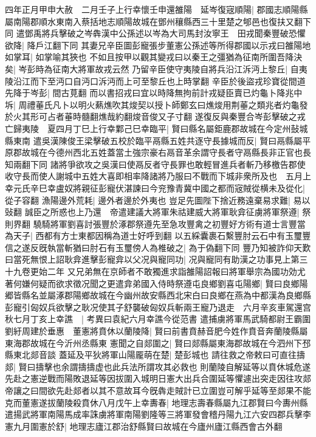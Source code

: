 四年正月甲申大赦　二月壬子上行幸懷壬申還雒陽　延岑復宼順陽|{
	郡國志順陽縣屬南陽郡順水東南入蔡括地志順陽故城在鄧州穰縣西三十里楚之郇邑也復扶又翻下同}
遣鄧禹將兵擊破之岑犇漢中公孫述以岑為大司馬封汝寧王　田戎聞秦豐破恐懼欲降|{
	降戶江翻下同}
其妻兄辛臣圖彭寵張步董憲公孫述等所得郡國以示戎曰雒陽地如掌耳|{
	如掌喻其狹也}
不如且按甲以觀其變戎曰以秦王之彊猶為征南所圍吾降決矣|{
	岑彭時為征南大將軍故戎云然}
乃留辛臣使守夷陵自將兵沿江泝沔上黎丘|{
	自夷陵沿江而下至沔口自沔口泝沔而上可至黎丘也上時掌翻}
辛臣於後盜戎珍寶從間道先降于岑彭|{
	間古莧翻}
而以書招戎曰宜以時降無拘前計戎疑臣賣已灼龜卜降兆中坼|{
	周禮菙氏凡卜以明火爇燋吹其焌契以授卜師鄭玄曰燋焌用荆菙之類兆者灼龜發於火其形可占者菙時髓翻燋哉約翻焌音俊又子寸翻}
遂復反與秦豐合岑彭擊破之戎亡歸夷陵　夏四月丁巳上行幸鄴己巳幸臨平|{
	賢曰縣名屬鉅鹿郡故城在今定州鼔城縣東南}
遣吳漢陳俊王梁擊破五校於臨平鬲縣五姓共逐守長據城而反|{
	賢曰鬲縣屬平原郡故城在今德州西北五姓蓋當土強宗豪右鬲音革余謂守長者守鬲縣長非正官也長知兩翻下同}
諸將爭欲攻之吳漢曰使鬲反者守長罪也敢輕冒進兵者斬乃移檄告郡使收守長而使人謝城中五姓大喜即相率降諸將乃服曰不戰而下城非衆所及也　五月上幸元氏辛巳幸盧奴將親征彭寵伏湛諫曰今兖豫青冀中國之都而宼賊從横未及從化|{
	從子容翻}
漁陽邊外荒耗|{
	邊外者邊於外夷也}
豈足先圖陛下捨近務遠棄易求難|{
	易以䜴翻}
誠臣之所惑也上乃還　帝遣建議大將軍朱祜建威大將軍耿弇征虜將軍祭遵|{
	祭則界翻}
驍騎將軍劉喜討張豐於涿郡祭遵先至急攻豐禽之初豐好方術有道士言豐當為天子|{
	西都有方士東都因稱為道士好呼到翻}
以五綵囊裹石繫豐肘云石中有玉璽豐信之遂反旣執當斬猶曰肘石有玉璽傍人為椎破之|{
	為于偽翻下同}
豐乃知被詐仰天歎曰當死無恨上詔耿弇進擊彭寵弇以父况與寵同功|{
	况與寵同有助漢之功事見上第三十九卷更始二年}
又兄弟無在京師者不敢獨進求詣雒陽詔報曰將軍舉宗為國功効尤著何嫌何疑而欲求徵况聞之更遣弇弟國入侍時祭遵屯良鄉劉喜屯陽鄉|{
	賢曰良鄉陽郷皆縣名並屬涿郡陽鄉故城在今幽州故安縣西北宋白曰良鄉在燕為中都漢為良鄉縣}
彭寵引匈奴兵欲擊之耿况使其子舒襲破匈奴兵斬兩王寵乃退走　六月辛亥車駕還宫　秋七月丁亥上幸譙　|{
	考異曰袁紀六月幸譙今從范書}
遣捕虜將軍馬武騎都尉王霸圍劉紆周建於垂惠　董憲將賁休以蘭陵降|{
	賢曰前書賁赫音肥今姓作賁音奔蘭陵縣屬東海郡故城在今沂州丞縣東}
憲聞之自郯圍之|{
	賢曰郯縣屬東海郡故城在今泗州下邳縣東北郯音談}
蓋延及平狄將軍山陽龎萌在楚|{
	楚彭城也}
請往救之帝敕曰可直往擣郯|{
	賢曰擣擊也余謂擣擣虚也此兵法所謂攻其必救也}
則蘭陵自解延等以賁休城危遂先赴之憲逆戰而陽敗退延等因拔圍入城明日憲大出兵合圍延等懼遽出突走因往攻郯帝讓之曰間欲先赴郯者以其不意故耳今旣犇走賊計已立圍豈可解乎延等至郯果不能克而董憲遂拔蘭陵殺賁休八月戊午上幸夀春|{
	地理志壽春縣屬九江郡賢曰今夀州縣}
遣揚武將軍南陽馬成率誅虜將軍南陽劉隆等三將軍發會稽丹陽九江六安四郡兵擊李憲九月圍憲於舒|{
	地理志廬江郡治舒縣賢曰故城在今廬州廬江縣西會古外翻}
